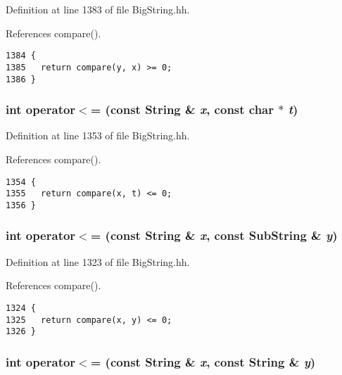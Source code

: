 Definition at line 1383 of file Big\-String.hh.

References compare().



\footnotesize\begin{verbatim}1384 {
1385   return compare(y, x) >= 0;
1386 }
\end{verbatim}\normalsize 
{}
\subsubsection{\setlength{\rightskip}{0pt plus 5cm}int operator$<$= (const {\bf String} \& {\em x}, const char $\ast$ {\em t})\hspace{0.3cm}{\tt  [inline]}}\label{BigString_8hh_a103}




Definition at line 1353 of file Big\-String.hh.

References compare().



\footnotesize\begin{verbatim}1354 {
1355   return compare(x, t) <= 0; 
1356 }
\end{verbatim}\normalsize 
{}
\subsubsection{\setlength{\rightskip}{0pt plus 5cm}int operator$<$= (const {\bf String} \& {\em x}, const {\bf Sub\-String} \& {\em y})\hspace{0.3cm}{\tt  [inline]}}\label{BigString_8hh_a97}




Definition at line 1323 of file Big\-String.hh.

References compare().



\footnotesize\begin{verbatim}1324 {
1325   return compare(x, y) <= 0; 
1326 }
\end{verbatim}\normalsize 
{}
\subsubsection{\setlength{\rightskip}{0pt plus 5cm}int operator$<$= (const {\bf String} \& {\em x}, const {\bf String} \& {\em y})\hspace{0.3cm}{\tt  [inline]}}\label{BigString_8hh_a91}




